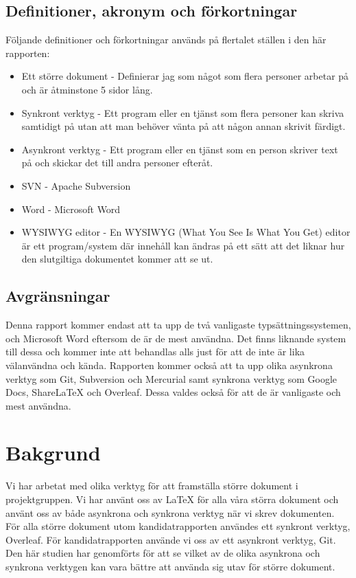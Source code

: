 \subsection{Definitioner, akronym och förkortningar}
Följande definitioner och förkortningar används på flertalet ställen i den här rapporten:
\begin{itemize}
	\item Ett större dokument - Definierar jag som något som flera personer arbetar på och är åtminstone 5 sidor lång.
	\item Synkront verktyg - Ett program eller en tjänst som flera personer kan skriva samtidigt på utan att man behöver vänta på att någon annan skrivit färdigt.
	\item Asynkront verktyg - Ett program eller en tjänst som en person skriver text på och skickar det till andra personer efteråt.
	\item SVN - Apache Subversion
	\item Word - Microsoft Word
	\item WYSIWYG editor - En WYSIWYG (What You See Is What You Get) editor är ett program/system där innehåll kan ändras på ett sätt att det liknar hur den slutgiltiga dokumentet kommer att se ut.
\end{itemize}

\subsection{Avgränsningar}
Denna rapport kommer endast att ta upp de två vanligaste typsättningssystemen, \latex och Microsoft Word eftersom de är de mest användna. Det finns liknande system till dessa och kommer inte att behandlas alls just för att de inte är lika välanvändna och kända. Rapporten kommer också att ta upp olika asynkrona verktyg som Git, Subversion och Mercurial samt synkrona verktyg som Google Docs, ShareLaTeX och Overleaf. Dessa valdes också för att de är vanligaste och mest användna.

\section{Bakgrund}
\label{sec:background-tuhkala}
Vi har arbetat med olika verktyg för att framställa större dokument i projektgruppen. Vi har använt oss av LaTeX för alla våra störra dokument och använt oss av både asynkrona och synkrona verktyg när vi skrev dokumenten. För alla större dokument utom kandidatrapporten användes ett synkront verktyg, Overleaf. För kandidatrapporten använde vi oss av ett asynkront verktyg, Git. Den här studien har genomförts för att se vilket av de olika asynkrona och synkrona verktygen kan vara bättre att använda sig utav för större dokument. 

